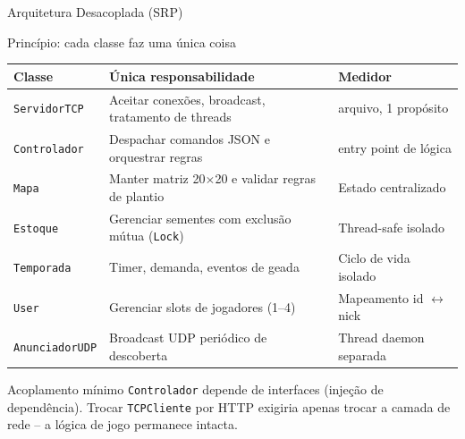 \documentclass[aspectratio=169]{beamer}
\begin{document}
\begin{frame}[shrink=8]{Arquitetura Desacoplada (SRP)}
  \begin{block}{Princ\'ipio: cada classe faz uma \'unica coisa}
    \footnotesize
    \begin{tabular}{>{\raggedright\arraybackslash}p{3cm}>{\raggedright\arraybackslash}p{5cm}>{\raggedright\arraybackslash}p{3.5cm}}
      \toprule
      \textbf{Classe} & \textbf{\'Unica responsabilidade} & \textbf{Medidor} \\
      \midrule
      \texttt{ServidorTCP} & Aceitar conex\~oes, broadcast, tratamento de threads & 1 arquivo, 1 prop\'osito \\
      \texttt{Controlador} & Despachar comandos JSON e orquestrar regras & 1 entry point de l\'ogica \\
      \texttt{Mapa} & Manter matriz 20$\times$20 e validar regras de plantio & Estado centralizado \\
      \texttt{Estoque} & Gerenciar sementes com exclus\~ao m\'utua (\texttt{Lock}) & Thread-safe isolado \\
      \texttt{Temporada} & Timer, demanda, eventos de geada & Ciclo de vida isolado \\
      \texttt{User} & Gerenciar slots de jogadores (1--4) & Mapeamento id $\leftrightarrow$ nick \\
      \texttt{AnunciadorUDP} & Broadcast UDP peri\'odico de descoberta & Thread daemon separada \\
      \bottomrule
    \end{tabular}
  \end{block}
  \begin{exampleblock}{Acoplamento m\'inimo}
    \texttt{Controlador} depende de interfaces (inje\c{c}\~ao de depend\^encia). Trocar \texttt{TCPCliente} por HTTP exigiria apenas trocar a camada de rede -- a l\'ogica de jogo permanece intacta.
  \end{exampleblock}
\end{frame}
\end{document}
